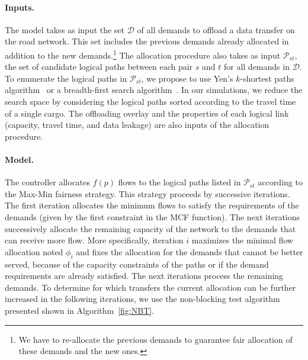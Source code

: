 \paragraph{Inputs.} 
The model takes as input the set $\mathcal{D}$ of all demands to offload a data transfer on the road network. This set includes the previous demands already allocated in addition to the new demands.\footnote{We have to re-allocate the previous demands to guarantee fair allocation of these demands and the new ones.} The allocation procedure also takes as input $\mathcal{P}_{st}$, the set of candidate logical paths between each pair $s$ and $t$ for all demands in $\mathcal{D}$. To enumerate the logical paths in $\mathcal{P}_{st}$, we propose to use Yen's $k$-shortest paths algorithm~\cite{yen1971finding} or a breadth-first search algorithm~\cite{lee1961algorithm}. In our simulations, we reduce the search space by considering the logical paths sorted according to the travel time of a single cargo. The offloading overlay and the properties of each logical link (\ie capacity, travel time, and data leakage) are also inputs of the allocation procedure.

\paragraph{Model.} 
The controller allocates $f(p)$ flows to the logical paths listed in $\mathcal{P}_{st}$ according to the \textsf{Max-Min fairness} strategy. This strategy proceeds by successive iterations.  The first iteration allocates the minimum flows to satisfy the requirements of the demands (given by the first constraint in the \textsf{MCF} function). The next iterations successively allocate the remaining capacity of the network to the demands that can receive more flow. More specifically, iteration $i$ maximizes the minimal flow allocation noted $\phi_{i}$ and fixes the allocation for the demands that cannot be better served, \ie because of the capacity constraints of the paths or if the demand requirements are already satisfied. The next iterations process the remaining demands. To determine for which transfers the current allocation can be further increased in the following iterations, we use the non-blocking test algorithm presented shown in Algorithm~\ref{fig:NBT}. 


